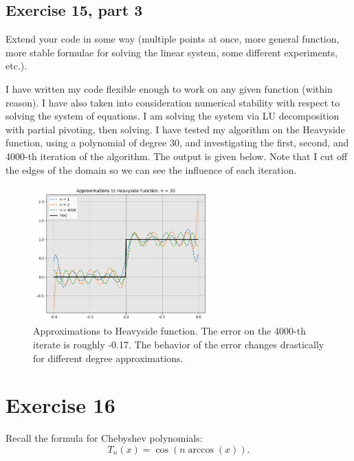 \newpage
\subsection{Exercise 15, part 3}
Extend your code in some way (multiple points at once, more general function, more stable formulae for solving the linear system, some different experiments, etc.).
\partbreak
\begin{solution}

    I have written my code flexible enough to work on any given function (within reason). I have also taken into consideration numerical stability with respect to solving the system of equations. I am solving the system via LU decomposition with partial pivoting, then solving. I have tested my algorithm on the Heavyside function, using a polynomial of degree 30, and investigating the first, second, and 4000-th iteration of the algorithm. The output is given below. Note that I cut off the edges of the domain so we can see the influence of each iteration. 
\end{solution}
\vspace{1in}
\begin{figure}[!hb]
    \centering
    \includegraphics[width = 0.6\textwidth]{Figures/RemezHeavyside.png}
    \caption{Approximations to Heavyside function. The error on the 4000-th iterate is roughly -0.17. The behavior of the error changes drastically for different degree approximations.}
    \label{fig:RemezHeavyside}
\end{figure}
\clearpage



\newpage
\section{Exercise 16}
Recall the formula for Chebyshev polynomials:
\[T_n(x) = \cos(n\arccos(x)).\]

